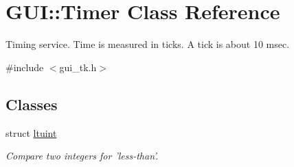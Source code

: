 \hypertarget{classGUI_1_1Timer}{\section{G\-U\-I\-:\-:Timer Class Reference}
\label{classGUI_1_1Timer}
}


Timing service. Time is measured in ticks. A tick is about 10 msec.  




{\ttfamily \#include $<$gui\-\_\-tk.\-h$>$}

\subsection*{Classes}
\begin{DoxyCompactItemize}
\item 
struct \hyperlink{structGUI_1_1Timer_1_1ltuint}{ltuint}
\begin{DoxyCompactList}\small\item\em Compare two integers for 'less-\/than'. \end{DoxyCompactList}\end{DoxyCompactItemize}
